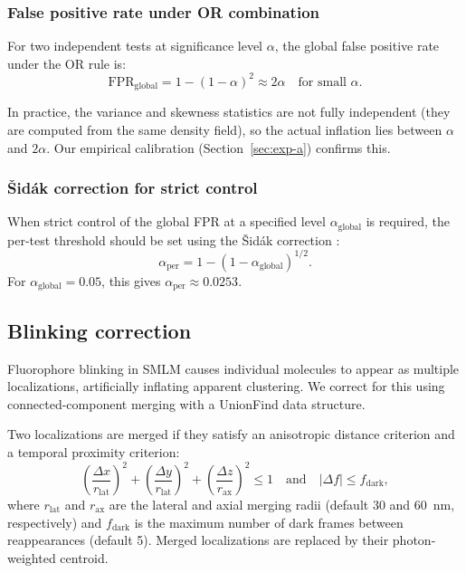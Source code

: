 \documentclass[11pt]{article}
\begin{document}
\subsubsection{False positive rate under OR combination}

For two independent tests at significance level $\alpha$, the global
false positive rate under the OR rule is:
\begin{equation}
  \mathrm{FPR}_\mathrm{global} = 1 - (1 - \alpha)^2 \approx 2\alpha
  \quad \text{for small } \alpha.
  \label{eq:fpr_or}
\end{equation}

In practice, the variance and skewness statistics are not fully
independent (they are computed from the same density field), so the
actual inflation lies between $\alpha$ and $2\alpha$. Our empirical
calibration (Section~\ref{sec:exp-a}) confirms this.

\subsubsection{\v{S}id\'ak correction for strict control}

When strict control of the global FPR at a specified level
$\alpha_\mathrm{global}$ is required, the per-test threshold should be
set using the \v{S}id\'ak correction \citep{sidak1967}:
\begin{equation}
  \alpha_\mathrm{per} = 1 - (1 - \alpha_\mathrm{global})^{1/2}.
  \label{eq:sidak}
\end{equation}
For $\alpha_\mathrm{global} = 0.05$, this gives
$\alpha_\mathrm{per} \approx 0.0253$.

\subsection{Blinking correction}
\label{sec:blinking}

Fluorophore blinking in SMLM causes individual molecules to appear as
multiple localizations, artificially inflating apparent clustering. We
correct for this using connected-component merging with a UnionFind data
structure.

Two localizations are merged if they satisfy an anisotropic distance
criterion and a temporal proximity criterion:
\begin{equation}
  \left(\frac{\Delta x}{r_\mathrm{lat}}\right)^2 +
  \left(\frac{\Delta y}{r_\mathrm{lat}}\right)^2 +
  \left(\frac{\Delta z}{r_\mathrm{ax}}\right)^2 \leq 1
  \quad \text{and} \quad
  |\Delta f| \leq f_\mathrm{dark},
  \label{eq:blink}
\end{equation}
where $r_\mathrm{lat}$ and $r_\mathrm{ax}$ are the lateral and axial
merging radii (default 30 and 60~nm, respectively) and $f_\mathrm{dark}$
is the maximum number of dark frames between reappearances (default 5).
Merged localizations are replaced by their photon-weighted centroid.
\end{document}
